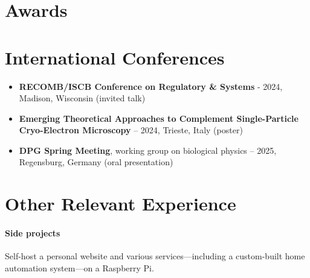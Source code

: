 \documentclass[10pt]{article} %
\begin{document}

\section{Awards}



\section{International Conferences}

\begin{itemize}
	\item \textbf{RECOMB/ISCB Conference on Regulatory \& Systems} - 2024, Madison, Wisconsin (invited talk)
	\item \textbf{Emerging Theoretical Approaches to Complement Single-Particle Cryo-Electron Microscopy} – 2024, Trieste, Italy (poster)
	\item \textbf{DPG Spring Meeting}, working group on biological physics – 2025, Regensburg, Germany (oral presentation)
\end{itemize}


\section{Other Relevant Experience}

\paragraph{Side projects} Self-host a personal website and various services—including a custom-built home automation system—on a Raspberry Pi.
\end{document}
